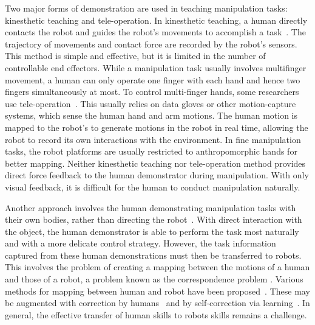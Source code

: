 Two major forms of demonstration are used in teaching manipulation
tasks: kinesthetic teaching and tele-operation. In kinesthetic
teaching, a human directly contacts the robot and guides the robot's
movements to accomplish a
task~\citep{korkinof2013online,pais2014encoding,pastor2011skill,Miao2014}. The
trajectory of movements and contact force are recorded by the robot's
sensors.
This method is simple and effective, but it is limited in the number
of controllable end effectors. %
While a manipulation task usually involves multifinger movement, a
human can only operate one finger with each hand and hence
two fingers simultaneously at most. To control multi-finger hands,
some researchers use
tele-operation~\citep{bernardino2013precision,kondo2008recognition,Fischer98}.
This usually relies on data gloves or other motion-capture systems, which
sense the human hand and arm motions. The human motion is mapped to
the robot's to generate motions in the robot in real time, allowing
the robot to record its own interactions with the
environment. %
In fine manipulation tasks, the robot platforms are usually restricted
to anthropomorphic hands for better mapping.
Neither kinesthetic teaching nor
tele-operation method provides direct force
feedback to the human demonstrator during manipulation. With only visual feedback,
it is difficult for the human to conduct manipulation naturally.

Another approach involves the human demonstrating manipulation tasks
with their own bodies, rather than directing the
robot~\citep{asfour2008imitation}. With direct interaction with the
object, the human demonstrator is able to perform the task most
naturally and with a more delicate control strategy. However, the task
information captured from these human demonstrations must then be
transferred to robots. This involves the problem of creating a mapping
between the motions of a human and those of a robot, a problem known
as the correspondence problem \citep{Nehaniv02}.
Various methods for mapping between human and
robot have been
proposed~\citep{hueser2006learning,asfour2008imitation,do2011towards}. These
may be augmented with
correction by humans~\citep{calinon2007incremental,sauser2011iterative,romano2011human}
and by self-correction via learning~\citep{bidan2013robio}. %
In general, the effective transfer of human skills to robots skills
remains a challenge.

